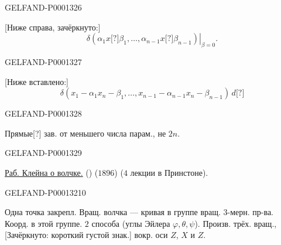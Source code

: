 \begin{GelfandAdjacentEvidence}{GELFAND-P000132}{6}

[Ниже справа, зачёркнуто:]
\begin{equation*}
\left.\delta(\alpha_1x\text{[?]}\beta_1,\ldots,\alpha_{n-1}x\text{[?]}\beta_{n-1})\right|_{\beta=0}.
\end{equation*}
\end{GelfandAdjacentEvidence}
\begin{GelfandAdjacentEvidence}{GELFAND-P000132}{7}

[Ниже вставлено:]
\begin{equation*}
\delta(x_1-\alpha_1x_n-\beta_1,\ldots,x_{n-1}-\alpha_{n-1}x_n-\beta_{n-1})\,d\text{[?]}
\end{equation*}
\end{GelfandAdjacentEvidence}
\begin{GelfandAdjacentEvidence}{GELFAND-P000132}{8}

Прямые[?] зав. от меньшего числа парам., не $2n$.
\end{GelfandAdjacentEvidence}
\begin{GelfandAdjacentEvidence}{GELFAND-P000132}{9}


\underline{Раб. Клейна о волчке.} () ($1896$) ($4$ лекции в Принстоне).
\end{GelfandAdjacentEvidence}
\begin{GelfandAdjacentEvidence}{GELFAND-P000132}{10}

Одна точка закрепл. Вращ. волчка — кривая в группе вращ. $3$-мерн. пр-ва. Коорд. в этой группе. $2$ способа (углы Эйлера $\varphi,\theta,\psi$).
Произв. трёх. вращ., [Зачёркнуто: короткий густой знак.] вокр. оси $Z$, $X$ и $Z$.
\end{GelfandAdjacentEvidence}
